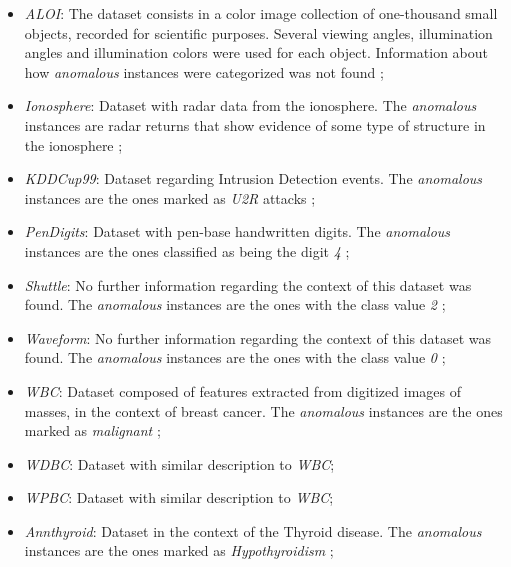 \begin{itemize}
	\item \textit{ALOI}: The dataset consists in a color image collection of one-thousand small objects, recorded for scientific purposes. Several viewing angles, illumination angles and illumination colors were used for each object. Information about how \textit{anomalous} instances were categorized was not found \cite{Campos2016};
	
	\item \textit{Ionosphere}: Dataset with radar data from the ionosphere. The \textit{anomalous} instances are radar returns that show evidence of some type of structure in the ionosphere \cite{sigillito1989classification, Campos2016};
	
	\item \textit{KDDCup99}: Dataset regarding Intrusion Detection events. The \textit{anomalous} instances are the ones marked as \textit{U2R} attacks \cite{Campos2016};
	
	\item \textit{PenDigits}: Dataset with pen-base handwritten digits. The \textit{anomalous} instances are the ones classified as being the digit \textit{4} \cite{Alimoglu96methodsof};
	
	\item \textit{Shuttle}: No further information regarding the context of this dataset was found. The \textit{anomalous} instances are the ones with the class value \textit{2} \cite{Campos2016};
	
	\item \textit{Waveform}: No further information regarding the context of this dataset was found. The \textit{anomalous} instances are the ones with the class value \textit{0} \cite{Campos2016};
	
	\item \textit{WBC}: Dataset composed of features extracted from digitized images of masses, in the context of breast cancer. The \textit{anomalous} instances are the ones marked as \textit{malignant} \cite{Campos2016};
	
	\item \textit{WDBC}: Dataset with similar description to \textit{WBC};
	
	\item \textit{WPBC}: Dataset with similar description to \textit{WBC};
	
	\item \textit{Annthyroid}: Dataset in the context of the Thyroid disease. The \textit{anomalous} instances are the ones marked as \textit{Hypothyroidism} \cite{Campos2016};
	

\end{itemize}
